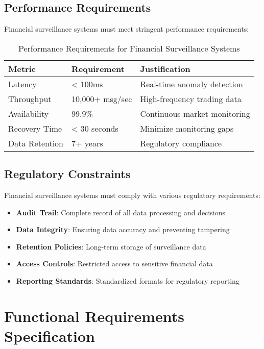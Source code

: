 \subsection{Performance Requirements}

Financial surveillance systems must meet stringent performance requirements:

\begin{table}[H]
\centering
\caption{Performance Requirements for Financial Surveillance Systems}
\begin{tabular}{@{}lll@{}}
\toprule
\textbf{Metric} & \textbf{Requirement} & \textbf{Justification} \\
\midrule
Latency & < 100ms & Real-time anomaly detection \\
Throughput & 10,000+ msg/sec & High-frequency trading data \\
Availability & 99.9\% & Continuous market monitoring \\
Recovery Time & < 30 seconds & Minimize monitoring gaps \\
Data Retention & 7+ years & Regulatory compliance \\
\bottomrule
\end{tabular}
\end{table}

\subsection{Regulatory Constraints}

Financial surveillance systems must comply with various regulatory requirements:

\begin{itemize}
    \item \textbf{Audit Trail}: Complete record of all data processing and decisions
    \item \textbf{Data Integrity}: Ensuring data accuracy and preventing tampering
    \item \textbf{Retention Policies}: Long-term storage of surveillance data
    \item \textbf{Access Controls}: Restricted access to sensitive financial data
    \item \textbf{Reporting Standards}: Standardized formats for regulatory reporting
\end{itemize}

\section{Functional Requirements Specification}

